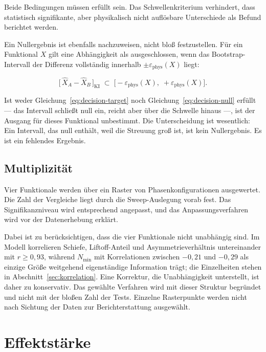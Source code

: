 \documentclass[12pt,a4paper]{report}
\begin{document}
Beide Bedingungen müssen erfüllt sein. Das Schwellenkriterium verhindert,
dass statistisch signifikante, aber physikalisch nicht auflösbare
Unterschiede als Befund berichtet werden.

Ein Nullergebnis ist ebenfalls nachzuweisen, nicht bloß festzustellen.
Für ein Funktional $X$ gilt eine Abhängigkeit als ausgeschlossen, wenn
das Bootstrap-Intervall der Differenz vollständig innerhalb
$\pm\varepsilon_{\mathrm{phys}}(X)$ liegt:

\begin{equation}
  \bigl[\, \hat{X}_A - \hat{X}_B \,\bigr]_{\mathrm{KI}}
  \;\subset\; \bigl[-\varepsilon_{\mathrm{phys}}(X),\; +\varepsilon_{\mathrm{phys}}(X)\bigr].
  \label{eq:decision-null}
\end{equation}

Ist weder Gleichung~\eqref{eq:decision-target} noch
Gleichung~\eqref{eq:decision-null} erfüllt --- das Intervall schließt
null ein, reicht aber über die Schwelle hinaus ---, ist der Ausgang für
dieses Funktional unbestimmt. Die Unterscheidung ist wesentlich: Ein
Intervall, das null enthält, weil die Streuung groß ist, ist kein
Nullergebnis. Es ist ein fehlendes Ergebnis.

\subsection{Multiplizität}

Vier Funktionale werden über ein Raster von Phasenkonfigurationen
ausgewertet. Die Zahl der Vergleiche liegt durch die Sweep-Auslegung
vorab fest. Das Signifikanzniveau wird entsprechend angepasst, und das
Anpassungsverfahren wird vor der Datenerhebung erklärt.

Dabei ist zu berücksichtigen, dass die vier Funktionale nicht unabhängig
sind. Im Modell korrelieren Schiefe, Liftoff-Anteil und
Asymmetrieverhältnis untereinander mit $r \geq 0{,}93$, während
$N_{\min}$ mit Korrelationen zwischen $-0{,}21$ und $-0{,}29$ als
einzige Größe weitgehend eigenständige Information trägt; die Einzelheiten
stehen in Abschnitt~\ref{sec:korrelation}. Eine Korrektur, die
Unabhängigkeit unterstellt, ist daher zu konservativ. Das gewählte
Verfahren wird mit dieser Struktur begründet und nicht mit der bloßen
Zahl der Tests. Einzelne
Rasterpunkte werden nicht nach Sichtung der Daten zur Berichterstattung
ausgewählt.

\section{Effektstärke}
\end{document}
